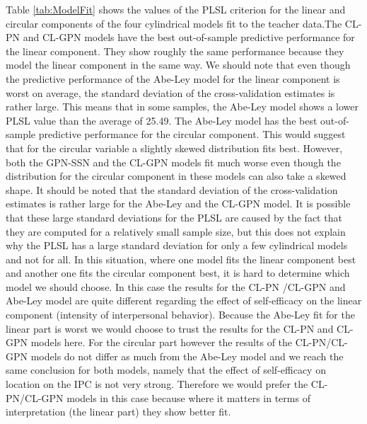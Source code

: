 \documentclass[man,mask]{apa6}
\begin{document}
Table \ref{tab:ModelFit} shows the values of the PLSL criterion for the linear
and circular components of the four cylindrical models fit to the teacher
data.\newline \indent The CL-PN and CL-GPN models have the best out-of-sample
predictive performance for the linear component. They show roughly the same
performance because they model the linear component in the same way. We should
note that even though the predictive performance of the Abe-Ley model for the
linear component is worst on average, the standard deviation of the
cross-validation estimates is rather large. This means that in some samples, the
Abe-Ley model shows a lower PLSL value than the average of 25.49.\newline
\indent The Abe-Ley model has the best out-of-sample predictive performance for
the circular component. This would suggest that for the circular variable a
slightly skewed distribution fits best. However, both the GPN-SSN and the
CL-GPN models fit much worse even though the distribution for the circular
component in these models can also take a skewed shape. It should be noted that
the standard deviation of the cross-validation estimates is rather large for
the Abe-Ley and the CL-GPN model. It is possible that these large standard
deviations for the PLSL are caused by the fact that they are computed for a
relatively small sample size, but this does not explain why the PLSL has a large
standard deviation for only a few cylindrical models and not for all.\newline
\indent In this situation, where one model fits the linear component best and
another one fits the circular component best, it is hard to determine which model
we should choose. In this case the results for the CL-PN /CL-GPN and Abe-Ley
model are quite different regarding the effect of self-efficacy on the linear
component (intensity of interpersonal behavior). Because the Abe-Ley fit for the
linear part is worst we would choose to trust the results for the CL-PN and
CL-GPN models here. For the circular part however the results of the CL-PN/CL-GPN
models do not differ as much from the Abe-Ley model and we reach the same
conclusion for both models, namely that the effect of self-efficacy on location on the IPC is not very strong. Therefore we would prefer the
CL-PN/CL-GPN models in this case because where it matters in terms of
interpretation (the linear part) they show better fit.
\end{document}
